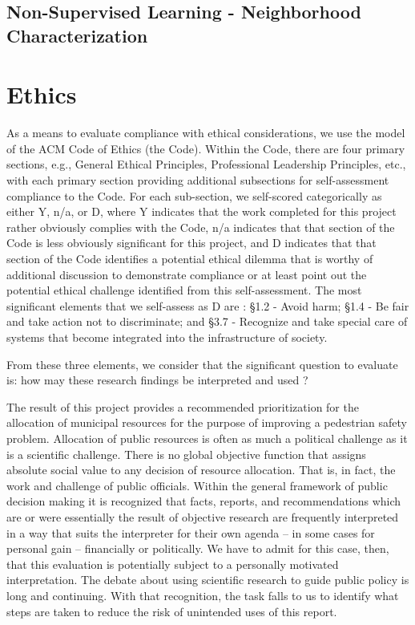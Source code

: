 \documentclass{llncs}
\begin{document}
\subsection{Non-Supervised Learning - Neighborhood Characterization}

%
\section{Ethics}
%
As a means to evaluate compliance with ethical considerations, we use the model of the ACM Code of Ethics  (the Code). Within the Code, there are four primary sections, e.g., General Ethical Principles, Professional Leadership Principles, etc., with each primary section providing additional subsections for self-assessment compliance to the Code. For each sub-section, we self-scored categorically as either Y, n/a, or D, where Y indicates that the work completed for this project rather obviously complies with the Code, n/a indicates that that section of the Code is less obviously significant for this project, and D indicates that that section of the Code identifies a potential ethical dilemma that is worthy of additional discussion to demonstrate compliance or at least point out the potential ethical challenge identified from this self-assessment.
The most significant elements that we self-assess as D are : \S 1.2 - Avoid harm; \S 1.4 - Be fair and take action not to discriminate; and \S 3.7 - Recognize and take special care of systems that become integrated into the infrastructure of society.

From these three elements, we consider that the significant question to evaluate is: how may these research findings be interpreted and used ?

The result of this project provides a recommended prioritization for the allocation of municipal resources for the purpose of improving a pedestrian safety problem. Allocation of  public resources is often as much a political challenge as it is a scientific challenge. There is no global objective function that assigns absolute social value to any decision of resource allocation. That is, in fact, the work and challenge of public officials. Within the general framework of public decision making it is recognized that facts, reports, and recommendations which are or were essentially the result of objective research are frequently interpreted in a way that suits the interpreter for their own agenda – in some cases for personal gain – financially or politically. We have to admit for this case, then, that this evaluation is potentially subject to a personally motivated interpretation. The debate about using scientific research to guide public policy is long and continuing. With that recognition, the task falls to us to identify what steps are taken to reduce the risk of unintended uses of this report.
\end{document}
